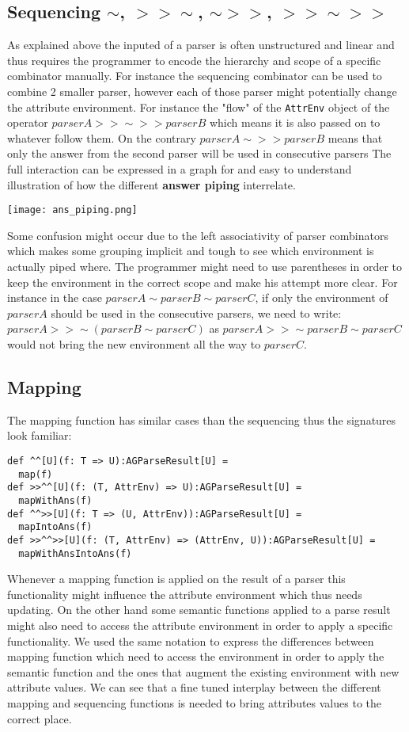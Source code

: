 \subsection{Sequencing $\sim$, $>>\sim$, $\sim >>$, $>> \sim >>$}

As explained above the inputed of a parser is often unstructured and linear and thus requires the programmer to encode the hierarchy and scope of a specific combinator manually. 
For instance the sequencing combinator can be used to combine 2 smaller parser, however each of those parser might potentially change the attribute environment.
For instance the "flow" of the \verb/AttrEnv/ object of the operator $parserA >> \sim >> parserB$ which means it is also passed on to whatever follow them. On the contrary $parserA \sim >> parserB$ means that only the answer from the second parser will be used in consecutive parsers
The full interaction can be expressed in a graph for and easy to understand illustration of how the different \textbf{answer piping} interrelate.
\begin{flushleft}
\centerline{\texttt{[image: ans\_piping.png]}}
\end{flushleft}
Some confusion might occur due to the left associativity of parser combinators which makes some grouping implicit and tough to see which environment is actually piped where.
The programmer might need to use parentheses in order to keep the environment in the correct scope and make his attempt more clear. For instance in the case $parserA \sim parserB \sim parserC$, if only the environment of $parserA$ should be used in the consecutive parsers, we need to write: $parserA >>\sim ( parserB \sim parserC )$ as $parserA >>\sim parserB \sim parserC$ would not bring the new environment all the way to $parserC$.

\subsection{Mapping}
The mapping function has similar cases than the sequencing thus the signatures look familiar:
\begin{lstlisting}
def ^^[U](f: T => U):AGParseResult[U] =
  map(f)
def >>^^[U](f: (T, AttrEnv) => U):AGParseResult[U] =
  mapWithAns(f)
def ^^>>[U](f: T => (U, AttrEnv)):AGParseResult[U] =
  mapIntoAns(f)
def >>^^>>[U](f: (T, AttrEnv) => (AttrEnv, U)):AGParseResult[U] =
  mapWithAnsIntoAns(f)
\end{lstlisting}

Whenever a mapping function is applied on the result of a parser this functionality might influence the attribute environment which thus needs updating. On the other hand some semantic functions applied to a parse result might also need to access the attribute environment in order to apply a specific functionality. We used the same notation to express the differences between mapping function which need to access the environment in order to apply the semantic function and the ones that augment the existing environment with new attribute values.
We can see that a fine tuned interplay between the different mapping and sequencing functions is needed to bring attributes values to the correct place.

